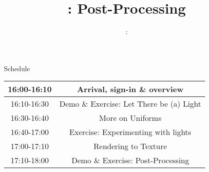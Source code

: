 \usepackage{../../beamerthemeFalmouthGamesAcademy}
\usepackage{multimedia}
\graphicspath{ {../../} }




\usepackage[normalem]{ulem}
\usepackage{wasysym}

\usepackage{pdfpages}

\usepackage{caption}
\captionsetup[figure]{font=scriptsize,labelfont=scriptsize}

\usetikzlibrary{arrows,automata}




\title{\sessionnumber: Post-Processing}
\subtitle{\modulecode: \moduletitle}

\frame{\titlepage} 





\begin{frame}{Schedule}
	\begin{center}
		\begin{tabular}{|c c|}
			\hline
			16:00-16:10 & Arrival, sign-in \& overview \\
			\hline
			16:10-16:30 & Demo \& Exercise: Let There be (a) Light \\
			16:30-16:40 & More on Uniforms \\
			16:40-17:00 & Exercise: Experimenting with lights \\
			\hline
			17:00-17:10 & Rendering to Texture \\
			17:10-18:00 & Demo \& Exercise: Post-Processing \\
			\hline
		\end{tabular}
	\end{center}
\end{frame}





